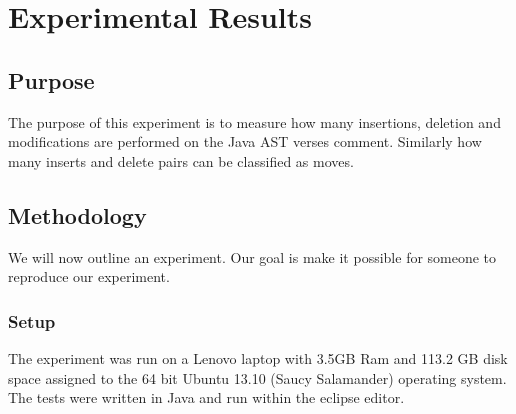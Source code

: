 
\chapter{Experimental Results}

\section{Purpose}
The purpose of this experiment is to measure how many insertions, deletion and modifications are performed on the Java AST verses comment. Similarly how many inserts and delete pairs can be classified as moves. 


\section{Methodology}
We will now outline an experiment. Our goal is make it possible for someone to reproduce our experiment.

\subsection{Setup}

The experiment was run on a Lenovo laptop with 3.5GB Ram and 113.2 GB disk space assigned to the 64 bit Ubuntu 13.10 (Saucy Salamander) operating system. The tests were written in Java and run within the eclipse editor.

